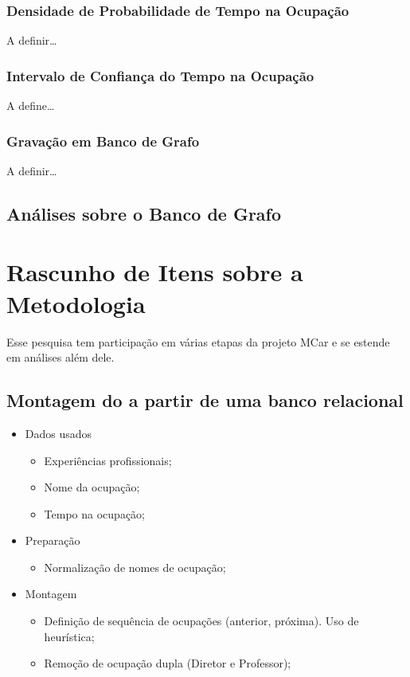 \documentclass[12pt,a4paper]{article}
\begin{document}
\subsubsection{Densidade de Probabilidade de Tempo na Ocupação}

A definir\ldots

\subsubsection{Intervalo de Confiança do Tempo na Ocupação}

A define\ldots

\subsubsection{Gravação em Banco de Grafo}

A definir\ldots

\subsection{Análises sobre o Banco de Grafo}


\section{Rascunho de Itens sobre a Metodologia} \label{sec:rascunho}


Esse pesquisa tem participação em várias etapas da projeto MCar e se estende em análises além dele.

\subsection{Montagem do a partir de uma banco relacional}

\begin{itemize}
\item Dados usados
	\begin{itemize}
	\item Experiências profissionais;
    \item Nome da ocupação;
    \item Tempo na ocupação;
	\end{itemize}
\item Preparação
	\begin{itemize}
	\item Normalização de nomes de ocupação;
	\end{itemize}
\item Montagem
	\begin{itemize}
	\item Definição de sequência de ocupações (anterior, próxima). Uso de heurística;
    \item Remoção de ocupação dupla (Diretor e Professor);
	\end{itemize}
\end{itemize}
\end{document}

